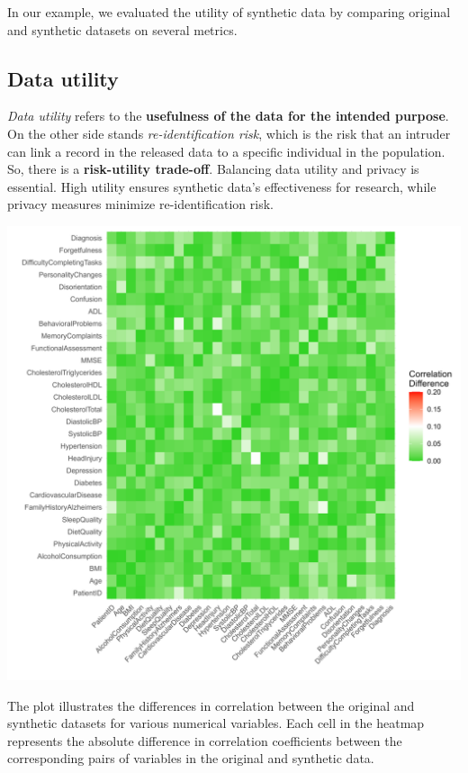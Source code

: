 \documentclass[a0,portrait]{a0poster}
\begin{document}
\begin{multicols}{3}
In our example, we evaluated the utility of synthetic data by comparing original and synthetic datasets on several metrics.

\subsection{Data utility}

\textit{Data utility} refers to the \textbf{usefulness of the data for the intended purpose}. On the other side stands \textit{re-identification risk}, which is the risk that an intruder can link a record in the released data to a specific individual in the population. So, there is a \textbf{risk-utility trade-off}.
Balancing data utility and privacy is essential. High utility ensures synthetic data's effectiveness for research, while privacy measures minimize re-identification risk.

\vspace{0.5cm}
\includegraphics[width=1\linewidth]{Poster TEX/figures/Correlation_Difference_v4.png}

The plot illustrates the differences in correlation between the original and synthetic datasets for various numerical variables. Each cell in the heatmap represents the absolute difference in correlation coefficients between the corresponding pairs of variables in the original and synthetic data.


\end{multicols}
\end{document}
